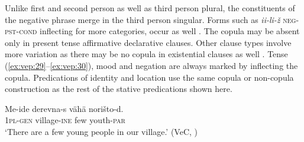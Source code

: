 \documentclass[output=paper,colorlinks=true, citecolor=brown]{langscibook}
\begin{document}
Unlike first and second person as well as third person plural, the constituents of the negative phrase merge in the third person singular. Forms such as \textit{ii-li-ž} \textsc{neg}{}-\textsc{pst{}-cond} inflecting for more categories, occur as well \citep[266]{Zaitseva2001}.
The copula may be absent only in present tense affirmative declarative clauses. Other clause types involve more variation as there may be no copula in existential clauses as well . Tense (\ref{ex:vep:29}–\ref{ex:vep:30}), mood and negation are always marked by inflecting the copula.
Predications of identity and location use the same copula or non-copula construction as the rest of the stative predications shown here.

\ea
    \label{ex:vep:28}
    \gll Me-ide derevna-s vähä norišto-d. \\
         \textsc{1pl-gen} village-\textsc{ine} few youth-\textsc{par}\\
    \glt ‘There are a few young people in our village.’ (VeC, \citealt[40]{MSFOu86})
\z 
\end{document}
